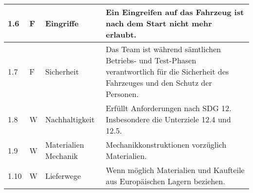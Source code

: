 \documentclass[main.tex]{subfiles} %
\begin{document}
\begin{tabular}{|l|p{0.5cm}|p{4cm}|p{10cm}|}
  \hline
  1.6          & F          & Eingriffe            & Ein Eingreifen auf das Fahrzeug ist nach dem Start nicht mehr erlaubt.                                                                                                                                                       \\
  \hline
  1.7          & F          & Sicherheit           & Das Team ist während sämtlichen Betriebs- und Test-Phasen verantwortlich für die Sicherheit des Fahrzeuges und den Schutz der Personen.                                                                                      \\
  \hline
  1.8          & W          & Nachhaltigkeit       & Erfüllt Anforderungen nach SDG 12. Insbesondere die Unterziele 12.4 und 12.5.                                                                                                                                                \\
  \hline
  1.9          & W          & Materialien Mechanik & Mechanikkonstruktionen vorzüglich Materialien.                                                                                                                                                                               \\
  \hline
  1.10         & W          & Lieferwege           & Wenn möglich Materialien und Kaufteile aus Europäischen Lagern beziehen.                                                                                                                                                                                                                                                                  \\
  \hline
\end{tabular}
\end{document}
